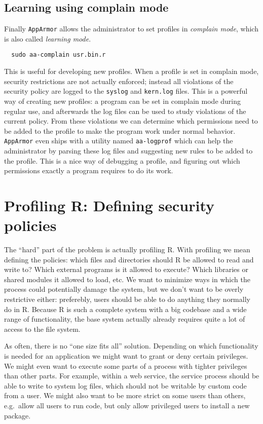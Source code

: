 \documentclass{jss}
\newcommand{\R}{\textsf{R}\xspace}
\newcommand{\AppArmor}{\texttt{AppArmor}\xspace}
\begin{document}
\subsection{Learning using complain mode}

Finally \AppArmor allows the administrator to set profiles in \emph{complain
mode}, which is also called \emph{learning mode}.
\begin{verbatim}
  sudo aa-complain usr.bin.r
\end{verbatim}
This is useful for developing new profiles. When a profile is set in complain
mode, security restrictions are not actually enforced; instead all violations
of the security policy are logged to the \texttt{syslog} and \texttt{kern.log}
files. This is a powerful way of creating new profiles: a program can be set in
complain mode during regular use, and afterwards the log files can be used to
study violations of the current policy. From these violations we can determine
which permissions need to be added to the profile to make the program work
under normal behavior. \AppArmor even ships with a utility named
\texttt{aa-logprof} which can help the administrator by parsing these log files and
suggesting new rules to be added to the profile. This is a nice way of
debugging a profile, and figuring out which permissions exactly a program
requires to do its work.

\section[Profiling R: Defining security policies]{Profiling \R: Defining security policies}

The ``hard'' part of the problem is actually profiling \R. With
profiling we mean defining the policies: which files and directories should
\R be allowed to read and write to? Which external programs is it
allowed to execute? Which libraries or shared modules it allowed to load, etc.
We want to minimize ways in which the process could potentially damage the
system, but we don't want to be overly restrictive either: preferebly, users
should be able to do anything they normally do in \R. Because \R is
such a complete system with a big codebase and a wide range of functionality,
the base system actually already requires quite a lot of access to the file
system.

As often, there is no ``one size fits all'' solution. Depending on which
functionality is needed for an application we might want to grant or deny
certain privileges. We might even want to execute some parts of a process with
tighter privileges than other parts. For example, within a web service, the
service process should be able to write to system log files, which should not be
writable by custom code from a user. We might also want to be more strict on
some users than others, e.g.\ allow all users to run code, but only allow
privileged users to install a new package.
\end{document}
